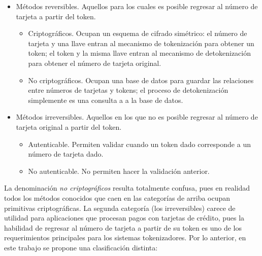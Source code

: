 \begin{itemize}
  \item Métodos reversibles. Aquellos para los cuales es posible regresar al
    número de tarjeta a partir del token.
    \begin{itemize}
      \item Criptográficos. Ocupan un esquema de cifrado simétrico: el número
        de tarjeta y una llave entran al mecanismo de tokenización para obtener
        un token; el token y la misma llave entran al mecanismo de
        detokenización para obtener el número de tarjeta original.
      \item No criptográficos. Ocupan una base de datos para guardar las
        relaciones entre números de tarjetas y tokens; el proceso de
        detokenización simplemente es una consulta a a la base de datos.
    \end{itemize}
  \item Métodos irreversibles. Aquellos en los que no es posible regresar al
    número de tarjeta original a partir del token.
    \begin{itemize}
      \item Autenticable. Permiten validar cuando un token dado corresponde a
        un número de tarjeta dado.
      \item No autenticable. No permiten hacer la validación anterior.
    \end{itemize}
\end{itemize}


La denominación \textit{no criptográficos} resulta totalmente confusa, pues en
realidad todos los métodos conocidos que caen en las categorías de arriba ocupan
primitivas criptográficas. La segunda categoría (los irreversibles) carece de
utilidad para aplicaciones que procesan pagos con tarjetas de crédito, pues la
habilidad de regresar al número de tarjeta a partir de su token es uno de los
requerimientos principales para los sistemas tokenizadores. Por lo anterior, en
este trabajo se propone una clasificación distinta:

